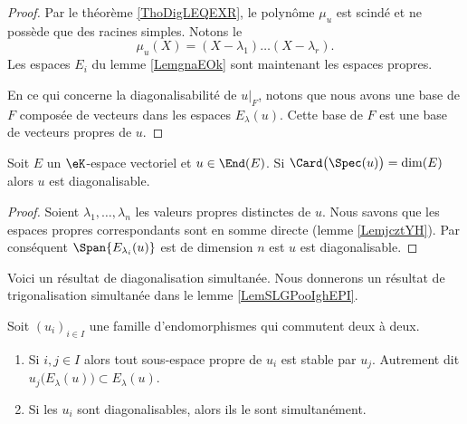 \begin{proof}
    Par le théorème \ref{ThoDigLEQEXR}, le polynôme \( \mu_u\) est scindé et ne possède que des racines simples. Notons le
    \begin{equation}
        \mu_u(X)=(X-\lambda_1)\ldots (X-\lambda_r).
    \end{equation}
    Les espaces \( E_i\) du lemme \ref{LemgnaEOk} sont maintenant les espaces propres.

    En ce qui concerne la diagonalisabilité de \( u|_F\), notons que nous avons une base de \( F\) composée de vecteurs dans les espaces \( E_{\lambda}(u)\). Cette base de \( F\) est une base de vecteurs propres de \( u\).
\end{proof}

\begin{lemma}
    Soit \( E\) un \( \eK\)-espace vectoriel et \( u\in\End(E)\). Si \( \Card\big( \Spec(u) \big)=\dim(E)\) alors \( u\) est diagonalisable.
\end{lemma}

\begin{proof}
    Soient \( \lambda_1,\ldots, \lambda_n\) les valeurs propres distinctes de \( u\). Nous savons que les espaces propres correspondants sont en somme directe (lemme \ref{LemjcztYH}). Par conséquent \( \Span\{ E_{\lambda_i}(u) \}\) est de dimension \( n\) est \( u\) est diagonalisable.
\end{proof}

Voici un résultat de diagonalisation simultanée. Nous donnerons un résultat de trigonalisation simultanée dans le lemme \ref{LemSLGPooIghEPI}.
\begin{proposition}     \label{PropGqhAMei}
    Soit \( (u_i)_{i\in I}\) une famille d'endomorphismes qui commutent deux à deux.
    \begin{enumerate}
        \item       \label{ItemGqhAMei}
            Si \( i,j\in I\) alors tout sous-espace propre de \( u_i\) est stable par \( u_j\). Autrement dit \( u_j\big(E_{\lambda}(u)\big)\subset E_{\lambda}(u)\).
        \item
            Si les \( u_i\) sont diagonalisables, alors ils le sont simultanément.
    \end{enumerate}
\end{proposition}

